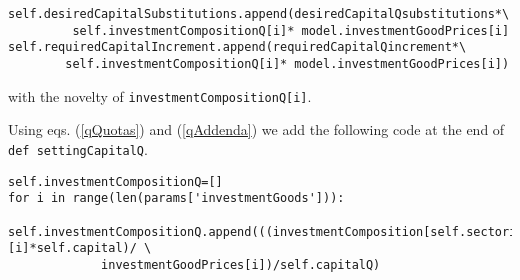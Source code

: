 \documentclass[]{amsart} %
\begin{document}
\scriptsize
\begin{verbatim}
self.desiredCapitalSubstitutions.append(desiredCapitalQsubstitutions*\
         self.investmentCompositionQ[i]* model.investmentGoodPrices[i]
self.requiredCapitalIncrement.append(requiredCapitalQincrement*\
        self.investmentCompositionQ[i]* model.investmentGoodPrices[i])
\end{verbatim}
\normalsize
with the novelty of \verb|investmentCompositionQ[i]|.

\vspace*{1cm}

Using eqs. (\ref{qQuotas}) and (\ref{qAddenda}) we add the following code at the end of \verb|def settingCapitalQ|.

\scriptsize
\begin{verbatim}
self.investmentCompositionQ=[]
for i in range(len(params['investmentGoods'])):
      self.investmentCompositionQ.append(((investmentComposition[self.sectorialClass][i]*self.capital)/ \
             investmentGoodPrices[i])/self.capitalQ)
\end{verbatim}
\normalsize
\end{document}
